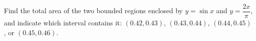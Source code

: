 Find the total area of the two bounded regions enclosed by $y=\sin x$ and $y=\dfrac{2x}{\pi}$, and indicate which interval contains it: $(0.42,0.43)$, $(0.43,0.44)$, $(0.44,0.45)$, or $(0.45,0.46)$.
